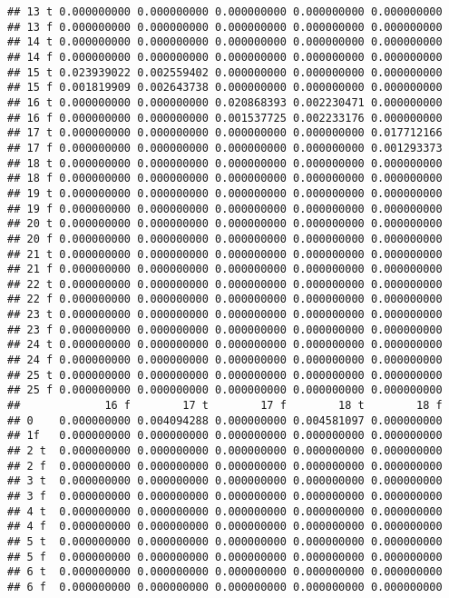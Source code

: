 \documentclass[]{article}
\begin{document}
\begin{verbatim}
## 13 t 0.000000000 0.000000000 0.000000000 0.000000000 0.000000000
## 13 f 0.000000000 0.000000000 0.000000000 0.000000000 0.000000000
## 14 t 0.000000000 0.000000000 0.000000000 0.000000000 0.000000000
## 14 f 0.000000000 0.000000000 0.000000000 0.000000000 0.000000000
## 15 t 0.023939022 0.002559402 0.000000000 0.000000000 0.000000000
## 15 f 0.001819909 0.002643738 0.000000000 0.000000000 0.000000000
## 16 t 0.000000000 0.000000000 0.020868393 0.002230471 0.000000000
## 16 f 0.000000000 0.000000000 0.001537725 0.002233176 0.000000000
## 17 t 0.000000000 0.000000000 0.000000000 0.000000000 0.017712166
## 17 f 0.000000000 0.000000000 0.000000000 0.000000000 0.001293373
## 18 t 0.000000000 0.000000000 0.000000000 0.000000000 0.000000000
## 18 f 0.000000000 0.000000000 0.000000000 0.000000000 0.000000000
## 19 t 0.000000000 0.000000000 0.000000000 0.000000000 0.000000000
## 19 f 0.000000000 0.000000000 0.000000000 0.000000000 0.000000000
## 20 t 0.000000000 0.000000000 0.000000000 0.000000000 0.000000000
## 20 f 0.000000000 0.000000000 0.000000000 0.000000000 0.000000000
## 21 t 0.000000000 0.000000000 0.000000000 0.000000000 0.000000000
## 21 f 0.000000000 0.000000000 0.000000000 0.000000000 0.000000000
## 22 t 0.000000000 0.000000000 0.000000000 0.000000000 0.000000000
## 22 f 0.000000000 0.000000000 0.000000000 0.000000000 0.000000000
## 23 t 0.000000000 0.000000000 0.000000000 0.000000000 0.000000000
## 23 f 0.000000000 0.000000000 0.000000000 0.000000000 0.000000000
## 24 t 0.000000000 0.000000000 0.000000000 0.000000000 0.000000000
## 24 f 0.000000000 0.000000000 0.000000000 0.000000000 0.000000000
## 25 t 0.000000000 0.000000000 0.000000000 0.000000000 0.000000000
## 25 f 0.000000000 0.000000000 0.000000000 0.000000000 0.000000000
##             16 f        17 t        17 f        18 t        18 f
## 0    0.000000000 0.004094288 0.000000000 0.004581097 0.000000000
## 1f   0.000000000 0.000000000 0.000000000 0.000000000 0.000000000
## 2 t  0.000000000 0.000000000 0.000000000 0.000000000 0.000000000
## 2 f  0.000000000 0.000000000 0.000000000 0.000000000 0.000000000
## 3 t  0.000000000 0.000000000 0.000000000 0.000000000 0.000000000
## 3 f  0.000000000 0.000000000 0.000000000 0.000000000 0.000000000
## 4 t  0.000000000 0.000000000 0.000000000 0.000000000 0.000000000
## 4 f  0.000000000 0.000000000 0.000000000 0.000000000 0.000000000
## 5 t  0.000000000 0.000000000 0.000000000 0.000000000 0.000000000
## 5 f  0.000000000 0.000000000 0.000000000 0.000000000 0.000000000
## 6 t  0.000000000 0.000000000 0.000000000 0.000000000 0.000000000
## 6 f  0.000000000 0.000000000 0.000000000 0.000000000 0.000000000

\end{verbatim}
\end{document}
